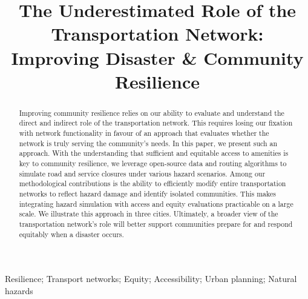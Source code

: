 \documentclass[review,3p,times,onecolumn,sort&compress,12pt]{elsarticle}
\begin{document}
\begin{frontmatter}

\title{The Underestimated Role of the Transportation Network: Improving Disaster \& Community Resilience}







\begin{abstract}
Improving community resilience relies on our ability to evaluate and understand the direct and indirect role of the transportation network.
This requires losing our fixation with network functionality in favour of an approach that evaluates whether the network is truly serving the community’s needs.
In this paper, we present such an approach. 
With the understanding that sufficient and equitable access to amenities is key to community resilience, we leverage open-source data and routing algorithms to simulate road and service closures under various hazard scenarios.
Among our methodological contributions is the ability to efficiently modify entire transportation networks to reflect hazard damage and identify isolated communities.
This makes integrating hazard simulation with access and equity evaluations practicable on a large scale.
We illustrate this approach in three cities.
Ultimately, a broader view of the transportation network's role will better support communities prepare for and respond equitably when a disaster occurs.
\end{abstract}

\begin{keyword}
Resilience; Transport networks; Equity; Accessibility; Urban planning; Natural hazards
\end{keyword}

\end{frontmatter}
\end{document}
